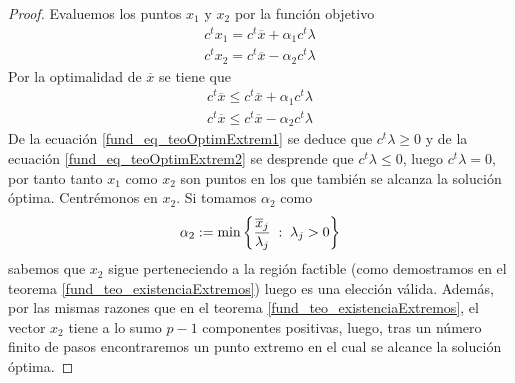 \begin{proof}
	Evaluemos los puntos $x_1$ y $x_2$ por la función objetivo
	\begin{equation*}
		\begin{array}{c}
		c^tx_1=c^t\overline{x}+\alpha_1c^t\lambda\\
		c^tx_2=c^t\overline{x}-\alpha_2c^t\lambda
		\end{array}
	\end{equation*}
	Por la optimalidad de $\overline{x}$ se tiene que
	\begin{gather}
		\label{fund_eq_teoOptimExtrem1}c^t\overline{x}\leq c^t\overline{x}+\alpha_1c^t\lambda\\
		\label{fund_eq_teoOptimExtrem2}c^t\overline{x}\leq c^t\overline{x}-\alpha_2c^t\lambda
	\end{gather}
	De la ecuación \eqref{fund_eq_teoOptimExtrem1} se deduce que $c^t\lambda\geq 0$ y de la ecuación \eqref{fund_eq_teoOptimExtrem2} se desprende que $c^t\lambda\leq 0$, luego $c^t\lambda=0$, por tanto tanto $x_1$ como $x_2$ son puntos en los que también se alcanza la solución óptima. Centrémonos en $x_2$. Si tomamos $\alpha_2$ como
	\begin{equation*}
		\alpha_2:=\min\left\{\frac{\overline{x}_j}{\lambda_j}\;:\; \lambda_j>0\right\}
	\end{equation*}
	sabemos que $x_2$ sigue perteneciendo a la región factible (como demostramos en el teorema \ref{fund_teo_existenciaExtremos}) luego es una elección válida. Además, por las mismas razones que en el teorema \ref{fund_teo_existenciaExtremos}, el vector $x_2$ tiene a lo sumo $p-1$ componentes positivas, luego, tras un número finito de pasos encontraremos un punto extremo en el cual se alcance la solución óptima.
\end{proof}
